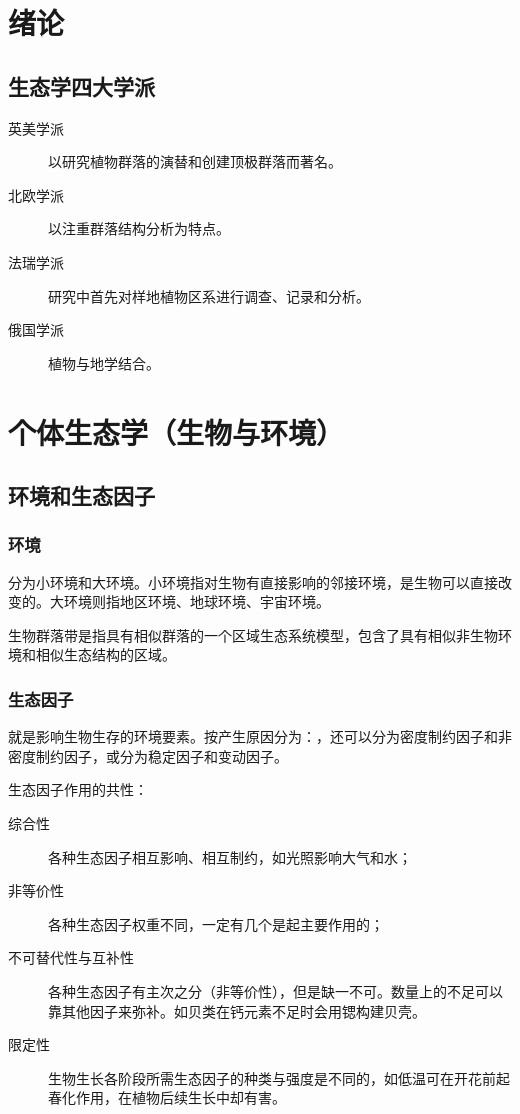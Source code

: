 \section{绪论}

\subsection{生态学四大学派}

\begin{description}
	\item[英美学派] 以研究植物群落的演替和创建顶极群落而著名。
	\item[北欧学派] 以注重群落结构分析为特点。
	\item[法瑞学派] 研究中首先对样地植物区系进行调查、记录和分析。
	\item[俄国学派] 植物与地学结合。
\end{description}


\section[个体生态学]{个体生态学（生物与环境）}

\subsection{环境和生态因子}
\subsubsection{环境}

	分为小环境和大环境。小环境指对生物有直接影响的邻接环境，是生物可以直接改变的。大环境则指地区环境、地球环境、宇宙环境。

	生物群落带是指具有相似群落的一个区域生态系统模型，包含了具有相似非生物环境和相似生态结构的区域。

\subsubsection{生态因子}

	就是影响生物生存的环境要素。按产生原因分为：，还可以分为密度制约因子和非密度制约因子，或分为稳定因子和变动因子。

	生态因子作用的共性：

	\begin{description}
		\item[综合性] 各种生态因子相互影响、相互制约，如光照影响大气和水；
		\item[非等价性] 各种生态因子权重不同，一定有几个是起主要作用的；
		\item[不可替代性与互补性] 各种生态因子有主次之分（非等价性），但是缺一不可。数量上的不足可以靠其他因子来弥补。如贝类在钙元素不足时会用锶构建贝壳。
		\item[限定性] 生物生长各阶段所需生态因子的种类与强度是不同的，如低温可在开花前起春化作用，在植物后续生长中却有害。
	\end{description}

